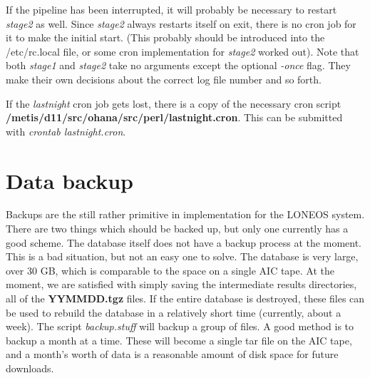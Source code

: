 \documentclass{article}
\newcommand\pr{\em}                   %
\newcommand\ff{\bf}                   %
\begin{document}
If the pipeline has been interrupted, it will probably be necessary to
restart {\pr stage2} as well.  Since {\pr stage2} always restarts
itself on exit, there is no cron job for it to make the initial start.
(This probably should be introduced into the /etc/rc.local file, or
some cron implementation for {\pr stage2} worked out).  Note that both
{\pr stage1} and {\pr stage2} take no arguments except the optional
{\pr -once} flag.  They make their own decisions about the correct log
file number and so forth.

If the {\pr lastnight} cron job gets lost, there is a copy of the
necessary cron script {\ff
/metis/d11/src/ohana/src/perl/lastnight.cron}.  This can be submitted
with {\pr crontab lastnight.cron}.

\section{Data backup}

Backups are the still rather primitive in implementation for the
LONEOS system.  There are two things which should be backed up, but
only one currently has a good scheme.  The database itself does not
have a backup process at the moment.  This is a bad situation, but not
an easy one to solve.  The database is very large, over 30 GB, which
is comparable to the space on a single AIC tape.  At the moment, we
are satisfied with simply saving the intermediate results directories,
all of the {\ff YYMMDD.tgz} files.  If the entire database is
destroyed, these files can be used to rebuild the database in a
relatively short time (currently, about a week).  The script {\pr
backup.stuff} will backup a group of files.  A good method is to
backup a month at a time.  These will become a single tar file on the
AIC tape, and a month's worth of data is a reasonable amount of disk
space for future downloads.
\end{document}
